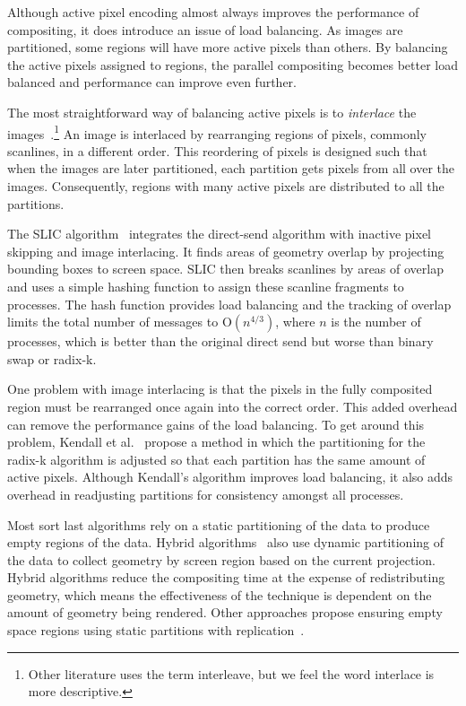 \documentclass{vgtc}                          %
\newcommand*{\lcite}[1]{~\cite{#1}}
\newcommand*{\scite}[1]{~\cite{#1}}
\newcommand{\etal}{et al.}
\newcommand*{\keyterm}[1]{\emph{#1}}
\newcommand{\Oh}{\mathrm{O}}
\begin{document}
Although active pixel encoding almost always improves the performance of
compositing, it does introduce an issue of load balancing.  As images are
partitioned, some regions will have more active pixels than others.  By
balancing the active pixels assigned to regions, the parallel compositing
becomes better load balanced and performance can improve even further.

The most straightforward way of balancing active pixels is to
\keyterm{interlace} the
images\lcite{Molnar1994,Takeuchi2003}.\footnote{Other literature uses the
  term interleave, but we feel the word interlace is more descriptive.}  An
image is interlaced by rearranging regions of pixels, commonly scanlines,
in a different order.  This reordering of pixels is designed such that when
the images are later partitioned, each partition gets pixels from all over
the images.  Consequently, regions with many active pixels are distributed
to all the partitions.

The SLIC algorithm\lcite{SLIC} integrates the direct-send algorithm with
inactive pixel skipping and image interlacing.  It finds areas of geometry
overlap by projecting bounding boxes to screen space.  SLIC then breaks
scanlines by areas of overlap and uses a simple hashing function to assign
these scanline fragments to processes.  The hash function provides load
balancing and the tracking of overlap limits the total number of messages
to $\Oh(n^{4/3})$, where $n$ is the number of processes, which is better
than the original direct send but worse than binary swap or radix-k.

One problem with image interlacing is that the pixels in the fully
composited region must be rearranged once again into the correct order.
This added overhead can remove the performance gains of the load balancing.
To get around this problem, Kendall \etal\scite{Kendall2010} propose a
method in which the partitioning for the radix-k algorithm is adjusted so
that each partition has the same amount of active pixels.  Although
Kendall's algorithm improves load balancing, it also adds overhead in
readjusting partitions for consistency amongst all processes.

Most sort last algorithms rely on a static partitioning of the data to
produce empty regions of the data.  Hybrid algorithms\lcite{Samanta2000}
also use dynamic partitioning of the data to collect geometry by screen
region based on the current projection.  Hybrid algorithms reduce the
compositing time at the expense of redistributing geometry, which means the
effectiveness of the technique is dependent on the amount of geometry being
rendered.  Other approaches propose ensuring empty space regions using
static partitions with replication\lcite{Samanta2001}.
\end{document}
